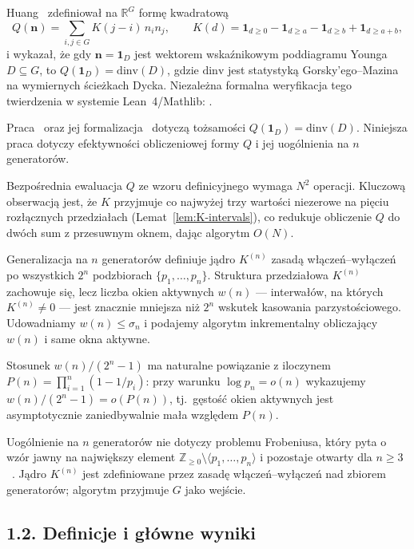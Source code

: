 \documentclass[11pt,a4paper]{amsart}
\theoremstyle{plain}
\theoremstyle{definition}
\theoremstyle{remark}
\begin{document}
Huang~\cite{Huang2026} zdefiniował na $\mathbb{R}^G$ formę kwadratową
\[
  Q(\mathbf{n}) = \sum_{i,j \in G} K(j - i)\, n_i n_j,
  \qquad
  K(d) = \mathbf{1}_{d \geq 0} - \mathbf{1}_{d \geq a}
         - \mathbf{1}_{d \geq b} + \mathbf{1}_{d \geq a+b},
\]
i wykazał, że gdy $\mathbf{n} = \mathbf{1}_D$ jest wektorem wskaźnikowym
poddiagramu Younga $D \subseteq G$, to $Q(\mathbf{1}_D) = \mathrm{dinv}(D)$,
gdzie $\mathrm{dinv}$ jest statystyką Gorsky'ego--Mazina na wymiernych
ścieżkach Dycka. Niezależna formalna weryfikacja tego twierdzenia
w systemie Lean~4/Mathlib: \cite{AxiomProver2026}.

Praca~\cite{Huang2026} oraz jej formalizacja~\cite{AxiomProver2026}
dotyczą tożsamości $Q(\mathbf{1}_D) = \mathrm{dinv}(D)$.
Niniejsza praca dotyczy efektywności obliczeniowej formy $Q$
i jej uogólnienia na $n$ generatorów.

Bezpośrednia ewaluacja $Q$ ze wzoru definicyjnego wymaga
$N^2$ operacji. Kluczową obserwacją jest, że $K$ przyjmuje
co najwyżej trzy wartości niezerowe na pięciu rozłącznych
przedziałach (Lemat~\ref{lem:K-intervals}), co redukuje
obliczenie $Q$ do dwóch sum z przesuwnym oknem, dając
algorytm $O(N)$.

Generalizacja na $n$ generatorów definiuje jądro $K^{(n)}$
zasadą włączeń--wyłączeń po wszystkich $2^n$ podzbiorach
$\{p_1, \ldots, p_n\}$. Struktura przedziałowa $K^{(n)}$
zachowuje się, lecz liczba okien aktywnych $w(n)$
--- interwałów, na których $K^{(n)} \neq 0$ ---
jest znacznie mniejsza niż $2^n$ wskutek kasowania
parzystościowego. Udowadniamy $w(n) \leq \sigma_n$
i podajemy algorytm inkrementalny obliczający $w(n)$
i same okna aktywne.

Stosunek $w(n)/(2^n - 1)$ ma naturalne powiązanie z iloczynem
$P(n) = \prod_{i=1}^n (1 - 1/p_i)$: przy warunku
$\log p_n = o(n)$ wykazujemy $w(n)/(2^n-1) = o(P(n))$,
tj.\ gęstość okien aktywnych jest asymptotycznie zaniedbywalnie
mała względem $P(n)$.

Uogólnienie na $n$ generatorów nie dotyczy problemu Frobeniusa,
który pyta o wzór jawny na największy element
$\mathbb{Z}_{\geq 0} \setminus \langle p_1,\ldots,p_n \rangle$
i pozostaje otwarty dla $n \geq 3$~\cite{Ramirez2005}.
Jądro $K^{(n)}$ jest zdefiniowane przez zasadę włączeń--wyłączeń
nad zbiorem generatorów; algorytm przyjmuje $G$ jako wejście.

\subsection*{1.2. Definicje i główne wyniki}
\end{document}
